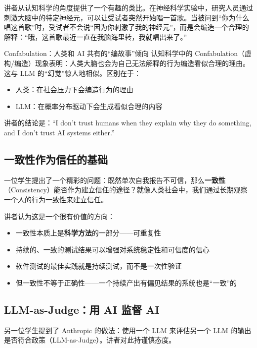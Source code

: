 \documentclass[a4paper]{article}
\begin{document}
讲者从认知科学的角度提供了一个有趣的类比。在神经科学实验中，研究人员通过刺激大脑中的特定神经元，可以让受试者突然开始唱一首歌。当被问到``你为什么唱这首歌''时，受试者不会说``因为你刺激了我的神经元''，而是会编造一个合理的解释：``哦，这首歌最近一直在我脑海里转，我就唱出来了。''

\begin{importantbox}{Confabulation：人类和 AI 共有的``编故事''倾向}
认知科学中的 Confabulation（虚构/编造）现象表明：人类大脑也会为自己无法解释的行为编造看似合理的理由。这与 LLM 的``幻觉''惊人地相似。区别在于：
\begin{itemize}
    \item 人类：在社会压力下会编造行为的理由
    \item LLM：在概率分布驱动下会生成看似合理的内容
\end{itemize}
讲者的结论是：``I don't trust humans when they explain why they do something, and I don't trust AI systems either.''
\end{importantbox}

\subsection{一致性作为信任的基础}

一位学生提出了一个精彩的问题：既然单次自我报告不可信，那么\textbf{一致性}（Consistency）能否作为建立信任的途径？就像人类社会中，我们通过长期观察一个人的行为一致性来建立信任。

讲者认为这是一个很有价值的方向：

\begin{itemize}
    \item 一致性本质上是\textbf{科学方法}的一部分——可重复性
    \item 持续的、一致的测试结果可以增强对系统稳定性和可信度的信心
    \item 软件测试的最佳实践就是持续测试，而不是一次性验证
    \item 但一致性不等于正确性——一个持续产出有偏见结果的系统也是``一致''的
\end{itemize}

\subsection{LLM-as-Judge：用 AI 监督 AI}

另一位学生提到了 Anthropic 的做法：使用一个 LLM 来评估另一个 LLM 的输出是否符合政策（LLM-as-Judge）。讲者对此持谨慎态度。
\end{document}
